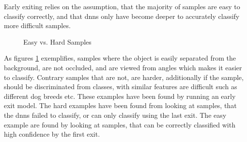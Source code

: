 Early exiting relies on the assumption, that the majority of samples are easy to classify correctly, and that \gls{dnn}s only have become deeper to accurately classify more difficult samples.

\begin{figure}
	\captionsetup[subfigure]{justification=centering}
	\centering
	\caption[Easy vs. Hard Samples]{Easy vs. Hard Samples}
	\label{fig:hardvseasydog}
\end{figure}

As figures \ref{fig:hardvseasydog} exemplifies, samples where the object is easily separated from the background, are not occluded, and are viewed from angles which makes it easier to classify. Contrary samples that are not, are harder, additionally if the sample, should be discriminated from classes, with similar features are difficult such as different dog breeds etc. These examples have been found by running an early exit model. The hard examples have been found from looking at samples, that the \gls{dnn}s failed to classify, or can only classify using the last exit. The easy example are found by looking at samples, that can be correctly classified with high confidence by the first exit. 

